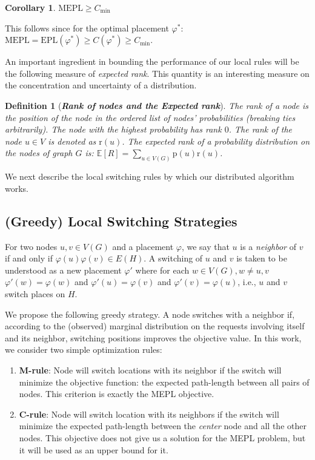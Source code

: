 \documentclass[conference]{IEEEtran}
\def\E{\mathbb{E}}
\def\p{\mathrm{p}}
\def\r{\mathrm{r}}
\def\epl{\mathrm{EPL}}
\def\mepl{\mathrm{MEPL}}
\newtheorem{corollary}{Corollary}
\newtheorem{definition}{Definition}
\begin{document}
\begin{corollary}
$\mepl \ge C_{\min}$
\end{corollary}
This follows since for the optimal placement $\varphi^*$: $\mepl = \epl(\varphi^*) \ge  C(\varphi^*) \ge C_{\min}$.

\noindent An important ingredient in bounding the performance of our local rules  will be the following measure of \emph{expected rank}.
This quantity is an interesting measure on the concentration and uncertainty of a distribution.
\begin{definition}[\bf \emph{Rank of nodes and the Expected rank}]\label{dfn:rank}
The rank of a node is the position of the node in the ordered list of nodes' probabilities (breaking ties arbitrarily). The node with the highest probability has rank $0$. The rank of the node $u \in V$ is denoted as $\r(u)$.
The expected rank of a probability distribution on the nodes of graph $G$ is:
$
\E\left[R\right]=\sum_{u\in V(G)}\p(u) \r(u)
$.
\end{definition}

We next describe the local switching rules by which our distributed algorithm works.

\subsection{(Greedy) Local Switching Strategies}
For two nodes $u,v \in V(G)$ and a placement $\varphi$, we say that $u$ is a \emph{neighbor} of $v$ if and only if $\varphi(u)\varphi(v) \in E(H)$.
A switching of $u$ and $v$ is taken to be understood as a new placement $\varphi'$ where for each $w \in V(G), w \neq u,v$ $  \varphi'(w)=\varphi(w)$ and $\varphi'(u)=\varphi(v)$ and $\varphi'(v)=\varphi(u)$, i.e., $u$ and $v$ switch places on $H$.

We propose the following greedy strategy. A node switches with a neighbor if, according to the (observed) marginal distribution on the requests involving itself and its neighbor, switching positions improves the objective value.
In this work, we consider two simple optimization rules:

\begin{enumerate}

\item \textbf{M-rule}: Node will switch locations  with its neighbor if the switch will minimize the objective function: the expected path-length between all pairs of nodes. This criterion is exactly the MEPL objective.

\item \textbf{C-rule}: Node will switch location with its neighbors if the switch will minimize the expected path-length between the \emph{center} node and all the other nodes. This objective does not give us a solution for the MEPL problem, but it will be used as an upper bound for it. 

\end{enumerate}
\end{document}
